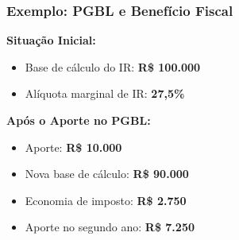 \begin{frame}[t]\frametitle{Exemplo: PGBL e Benefício Fiscal}
  \textbf{Situação Inicial:}
  \begin{itemize}
    \item Base de cálculo do IR: \textbf{R\$ 100.000}
    \item Alíquota marginal de IR: \textbf{27,5\%}
  \end{itemize}

  \vspace{0.3cm}
  \textbf{Após o Aporte no PGBL:}
  \begin{itemize}
    \item Aporte: \textbf{R\$ 10.000}
    \item Nova base de cálculo: \textbf{R\$ 90.000}
    \item Economia de imposto: \textbf{R\$ 2.750}
    \item Aporte no segundo ano: \textbf{R\$ 7.250}
  \end{itemize}
\end{frame}
